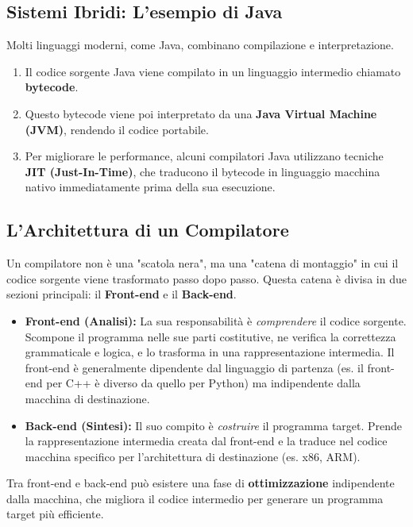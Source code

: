 \subsection{Sistemi Ibridi: L'esempio di Java}
Molti linguaggi moderni, come Java, combinano compilazione e interpretazione.
\begin{enumerate}
    \item Il codice sorgente Java viene compilato in un linguaggio intermedio chiamato \textbf{bytecode}.
    \item Questo bytecode viene poi interpretato da una \textbf{Java Virtual Machine (JVM)}, rendendo il codice portabile.
    \item Per migliorare le performance, alcuni compilatori Java utilizzano tecniche \textbf{JIT (Just-In-Time)}, che traducono il bytecode in linguaggio macchina nativo immediatamente prima della sua esecuzione.
\end{enumerate}

\subsection{L'Architettura di un Compilatore}

Un compilatore non è una "scatola nera", ma una "catena di montaggio" in cui il codice sorgente viene trasformato passo dopo passo. Questa catena è divisa in due sezioni principali: il \textbf{Front-end} e il \textbf{Back-end}.

\begin{itemize}
    \item \textbf{Front-end (Analisi):} La sua responsabilità è \textit{comprendere} il codice sorgente. Scompone il programma nelle sue parti costitutive, ne verifica la correttezza grammaticale e logica, e lo trasforma in una rappresentazione intermedia. Il front-end è generalmente dipendente dal linguaggio di partenza (es. il front-end per C++ è diverso da quello per Python) ma indipendente dalla macchina di destinazione.

    \item \textbf{Back-end (Sintesi):} Il suo compito è \textit{costruire} il programma target. Prende la rappresentazione intermedia creata dal front-end e la traduce nel codice macchina specifico per l'architettura di destinazione (es. x86, ARM).
\end{itemize}

Tra front-end e back-end può esistere una fase di \textbf{ottimizzazione} indipendente dalla macchina, che migliora il codice intermedio per generare un programma target più efficiente.


